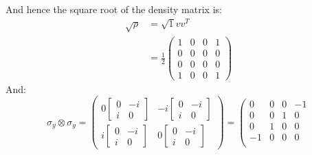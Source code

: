 \documentclass[12pt,a4]{article}
\begin{document}
\begin{enumerate}
\begin{enumerate}
        And hence the square root of the density matrix is:
        \begin{align*}
          \sqrt{\rho} 
            &= 
            \sqrt{1} v v^T \\
            &= 
            \frac{1}{2}
          \left(
          \begin{matrix}
            1 & 0 & 0 & 1\\
            0 & 0 & 0 & 0\\
            0 & 0 & 0 & 0\\
            1 & 0 & 0 & 1
          \end{matrix}
          \right)
        \end{align*}
        And:
        \begin{equation*}
          \sigma_y \otimes \sigma_y
          =
          \left(
          \begin{matrix}
            0
            \left[
            \begin{matrix}
              0 &-i\\
              i & 0
            \end{matrix}
            \right]
            &
            -i 
            \left[
            \begin{matrix}
              0 &-i\\
              i & 0
            \end{matrix}
            \right] \\
            i
            \left[
            \begin{matrix}
              0 &-i\\
              i & 0
            \end{matrix}
            \right]
            &
            0 
            \left[
            \begin{matrix}
              0 &-i\\
              i & 0
            \end{matrix}
            \right]
          \end{matrix}
          \right)
          =
          \left(
            \begin{matrix}
              0 & 0 & 0 & -1\\
              0 & 0 & 1 &  0\\
              0 & 1 & 0 &  0\\
             -1 & 0 & 0 &  0\\
            \end{matrix}

\end{equation*}
\end{enumerate}
\end{enumerate}
\end{document}

